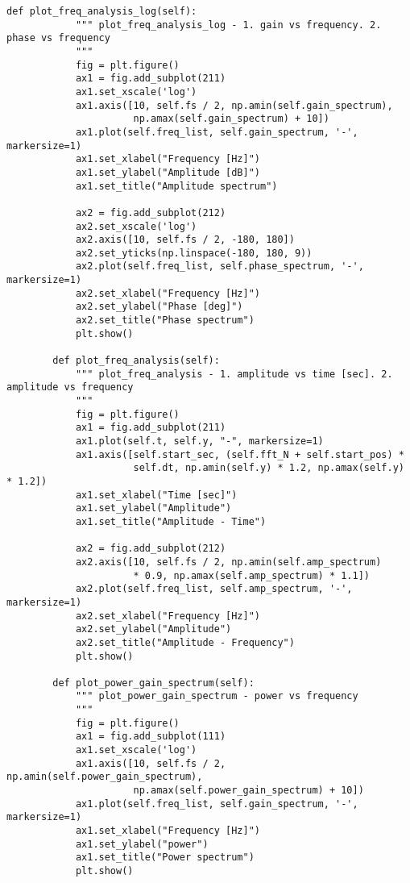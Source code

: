 \begin{lstlisting}[caption=plot\_tools.py,label=plot\_tools.py]
        def plot_freq_analysis_log(self):
            """ plot_freq_analysis_log - 1. gain vs frequency. 2. phase vs frequency
            """
            fig = plt.figure()
            ax1 = fig.add_subplot(211)
            ax1.set_xscale('log')
            ax1.axis([10, self.fs / 2, np.amin(self.gain_spectrum),
                      np.amax(self.gain_spectrum) + 10])
            ax1.plot(self.freq_list, self.gain_spectrum, '-', markersize=1)
            ax1.set_xlabel("Frequency [Hz]")
            ax1.set_ylabel("Amplitude [dB]")
            ax1.set_title("Amplitude spectrum")
    
            ax2 = fig.add_subplot(212)
            ax2.set_xscale('log')
            ax2.axis([10, self.fs / 2, -180, 180])
            ax2.set_yticks(np.linspace(-180, 180, 9))
            ax2.plot(self.freq_list, self.phase_spectrum, '-', markersize=1)
            ax2.set_xlabel("Frequency [Hz]")
            ax2.set_ylabel("Phase [deg]")
            ax2.set_title("Phase spectrum")
            plt.show()
    
        def plot_freq_analysis(self):
            """ plot_freq_analysis - 1. amplitude vs time [sec]. 2. amplitude vs frequency
            """
            fig = plt.figure()
            ax1 = fig.add_subplot(211)
            ax1.plot(self.t, self.y, "-", markersize=1)
            ax1.axis([self.start_sec, (self.fft_N + self.start_pos) *
                      self.dt, np.amin(self.y) * 1.2, np.amax(self.y) * 1.2])
            ax1.set_xlabel("Time [sec]")
            ax1.set_ylabel("Amplitude")
            ax1.set_title("Amplitude - Time")
    
            ax2 = fig.add_subplot(212)
            ax2.axis([10, self.fs / 2, np.amin(self.amp_spectrum)
                      * 0.9, np.amax(self.amp_spectrum) * 1.1])
            ax2.plot(self.freq_list, self.amp_spectrum, '-', markersize=1)
            ax2.set_xlabel("Frequency [Hz]")
            ax2.set_ylabel("Amplitude")
            ax2.set_title("Amplitude - Frequency")
            plt.show()
    
        def plot_power_gain_spectrum(self):
            """ plot_power_gain_spectrum - power vs frequency
            """
            fig = plt.figure()
            ax1 = fig.add_subplot(111)
            ax1.set_xscale('log')
            ax1.axis([10, self.fs / 2, np.amin(self.power_gain_spectrum),
                      np.amax(self.power_gain_spectrum) + 10])
            ax1.plot(self.freq_list, self.gain_spectrum, '-', markersize=1)
            ax1.set_xlabel("Frequency [Hz]")
            ax1.set_ylabel("power")
            ax1.set_title("Power spectrum")
            plt.show()
    

\end{lstlisting}
